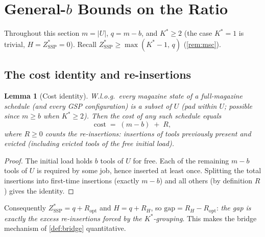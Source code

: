 \documentclass[11pt,a4paper]{article}
\theoremstyle{plain}
\newtheorem{lemma}[theorem]{Lemma}
\theoremstyle{definition}
\newcommand{\Kstar}{K^{*}}
\newcommand{\ZSSP}{Z_{\mathrm{SSP}}^{*}}
\begin{document}
\section{General-$b$ Bounds on the Ratio}
\label{sec:generalb}


Throughout this section $m=|U|$, $q=m-b$, and $K^{*}\ge2$ (the case $\Kstar=1$ is
trivial, $H=\ZSSP=0$). Recall $\ZSSP\ge\max(\Kstar-1,\,q)$ (\cref{rem:msc}).

\subsection{The cost identity and re-insertions}

\begin{thmbox}
\begin{lemma}[Cost identity]
\label{lem:costid}
W.l.o.g.\ every magazine state of a full-magazine schedule (and every GSP configuration)
is a subset of $U$ (pad within $U$; possible since $m\ge b$ when $\Kstar\ge2$). Then the
cost of any such schedule equals
\[
  \mathrm{cost} \;=\; (m-b)\;+\;R,
\]
where $R\ge0$ counts the \emph{re-insertions}: insertions of tools previously present and
evicted (including evicted tools of the free initial load).
\end{lemma}
\end{thmbox}
\begin{proofbox}
\begin{proof}
The initial load holds $b$ tools of $U$ for free. Each of the remaining $m-b$ tools of
$U$ is required by some job, hence inserted at least once. Splitting the total insertions
into first-time insertions (exactly $m-b$) and all others (by definition $R$) gives the
identity.
\end{proof}
\end{proofbox}

\noindent Consequently $\ZSSP=q+R_{\mathrm{opt}}$ and $H=q+R_{H}$, so
$\mathrm{gap}=R_{H}-R_{\mathrm{opt}}$: \emph{the gap is exactly the excess re-insertions
forced by the $\Kstar$-grouping}. This makes the bridge mechanism of \cref{def:bridge}
quantitative.
\end{document}
